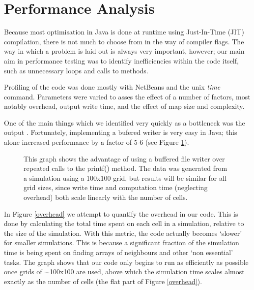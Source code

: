 \section{Performance Analysis} %
   
    Because most optimisation in Java is done at runtime using Just-In-Time (JIT) compilation, there is not much to choose from in the way
  	 of compiler flags. The way in which a problem is laid out is always very important, however; our main aim in performance testing
 	 was to identify inefficiencies within the code itself, such as unnecessary loops and calls to methods.\newline{}
 	
 	 Profiling of the code was done mostly with NetBeans and the unix \emph{time} command. Parameters were varied to asses the effect of a number of 
 	 factors, most notably overhead, output write time, and the effect of map size and complexity.\newline{}
 
 	 One of the main things which we identified	very quickly as a bottleneck was the output . Fortunately, implementing a bufered writer is
	 very easy in Java; this alone increased performance by a factor of 5-6 (see Figure \ref{buffering}).\newline{}
	
  \begin{figure}[h]
  \begin{center}
  
  \caption{\label{buffering}This graph shows the advantage of using a buffered file writer over repeated calls to the printf() method. 
  The data was generated from a simulation using a 100x100 grid, but results will be similar for all grid sizes, since write time and computation
  time (neglecting overhead) both scale linearly with the number of cells.}
  \end{center}
  \end{figure} 

	 In Figure \ref{overhead} we attempt to quantify the overhead in our code. This is done by calculating the total time spent on each cell in a 
	 simulation, relative to the size of the simulation. With this metric, the code actually becomes `slower' for smaller simulations. This is 
	 because a significant fraction of the simulation time is being spent on finding arrays of neighbours and other `non essential' tasks. The graph
	 shows that our code only begins to run as efficiently as possible once grids of $\sim$100x100 are used, above which the simulation time scales
	 almost exactly as the number of cells (the flat part of Figure \ref{overhead}).\newline{}
	 
